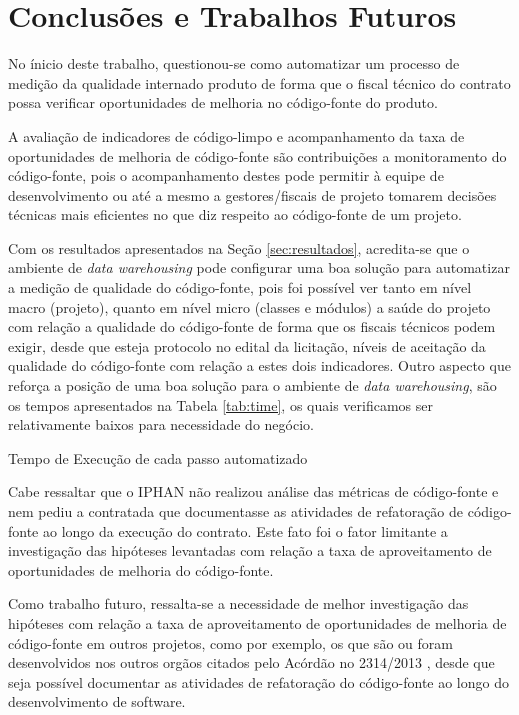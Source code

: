 \section{Conclusões e Trabalhos Futuros}

No ínicio deste trabalho, questionou-se como automatizar um processo de medição da qualidade internado produto de forma que o fiscal técnico do contrato possa verificar oportunidades de melhoria no código-fonte do produto. 

A avaliação de indicadores de código-limpo e acompanhamento da taxa de oportunidades de melhoria de código-fonte são contribuições a monitoramento do código-fonte, pois o acompanhamento destes pode permitir à equipe de desenvolvimento ou até a mesmo a gestores/fiscais de projeto tomarem decisões técnicas mais eficientes no que diz respeito ao código-fonte de um projeto.

Com os resultados apresentados na Seção \ref{sec:resultados}, acredita-se que o ambiente de \textit{data warehousing} pode configurar uma boa solução para automatizar a medição de qualidade do código-fonte, pois foi possível ver tanto em nível macro (projeto), quanto em nível micro (classes e módulos) a saúde do projeto com relação a qualidade do código-fonte de forma que os fiscais técnicos podem exigir, desde que esteja protocolo no edital da licitação, níveis de aceitação da qualidade do código-fonte com relação a estes dois indicadores. Outro aspecto que reforça a posição de uma boa solução para o ambiente de \textit{data warehousing}, são os tempos apresentados na Tabela \ref{tab:time}, os quais verificamos ser relativamente baixos para necessidade do negócio.	

\begin{table}[!ht]
\centering
\caption{Tempo de Execução de cada passo automatizado}
\label{tab:time}

\end{table}
\FloatBarrier

Cabe ressaltar que o IPHAN não realizou análise das métricas de código-fonte e nem pediu a contratada que documentasse as atividades de refatoração de código-fonte ao longo da execução do contrato. Este fato foi o fator limitante a investigação das hipóteses levantadas com relação a taxa de aproveitamento de oportunidades de melhoria do código-fonte. 

Como trabalho futuro, ressalta-se a necessidade de melhor investigação das hipóteses com relação a taxa de aproveitamento de oportunidades de melhoria de código-fonte em outros projetos, como por exemplo, os que são ou foram desenvolvidos nos outros orgãos citados pelo Acórdão no 2314/2013 \cite{TCU:2013}, desde que seja possível documentar as atividades de refatoração do código-fonte ao longo do desenvolvimento de software. 